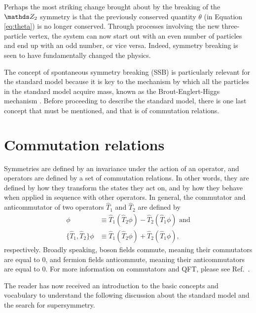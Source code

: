 Perhaps the most striking change brought about by the breaking of the $\ztwo$ symmetry is that the previously conserved quantity $\theta$ (in Equation \ref{eq:theta}) is no longer conserved. Through processes involving the new three-particle vertex, the system can now start out with an even number of particles and end up with an odd number, or vice versa. Indeed, symmetry breaking is seen to have fundamentally changed the physics.

The concept of spontaneous symmetry breaking (SSB) is particularly relevant for the standard model because it is key to the mechanism by which all the particles in the standard model acquire mass, known as the Brout-Englert-Higgs mechanism \cite{Higgs:1964pj}. Before proceeding to describe the standard model, there is one last concept that must be mentioned, and that is of commutation relations.

\section{Commutation relations}
Symmetries are defined by an invariance under the action of an operator, and operators are defined by a set of commutation relations. In other words, they are defined by how they transform the states they act on, and by how they behave when applied in sequence with other operators. In general, the commutator and anticommutator of two operators $\hat{T}_1$ and $\hat{T}_2$ are defined by
\begin{align}
[\hat{T}_1,\hat{T}_2]\phi &\equiv \hat{T}_1 (\hat{T}_2 \phi)  - \hat{T}_2 (\hat{T}_1 \phi) \text{\ and}\\
\{\hat{T}_1,\hat{T}_2\}\phi &\equiv \hat{T}_1 (\hat{T}_2 \phi)  + \hat{T}_2 (\hat{T}_1 \phi),
\end{align}
respectively. Broadly speaking, boson fields commute, meaning their commutators are equal to 0, and fermion fields anticommute, meaning their anticommutators are equal to 0. For more information on commutators and QFT, please see Ref.~\cite{Peskin:1995ev}.

The reader has now received an introduction to the basic concepts and vocabulary to understand the following discussion about the standard model and the search for supersymmetry.



